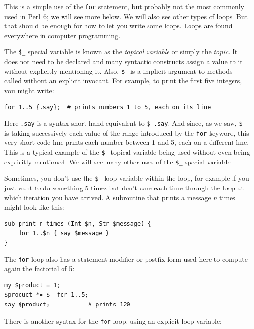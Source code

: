 This is a simple use of the {\tt for} statement, 
but probably not the most commonly used in Perl~6; 
we will see more below. We will also see other types of loops. 
But that should be enough for now to let you write some loops. Loops 
are found everywhere in computer programming.

The \verb"$_" special variable is known as the \emph{topical 
variable} or simply the \emph{topic}. It does not need to be declared 
and many syntactic constructs assign a value to it without 
explicitly mentioning it. Also, \verb"$_" is a implicit argument 
to methods called without an explicit invocant. For example, 
to print the first five integers, you might write:

\begin{verbatim}
for 1..5 {.say};  # prints numbers 1 to 5, each on its line
\end{verbatim} 

Here {\tt .say} is a syntax short hand equivalent to \verb"$_.say". And 
since, as we saw, \verb"$_" is taking successively each value of 
the range introduced by the {\tt for} keyword, this very short code 
line prints each number between 1 and 5, each on a different line. 
This is a typical example of the \verb"$_" topical variable being used 
without even being explicitly mentioned. We will see many other 
uses of the \verb"$_" special variable. 

Sometimes, you don't use the \verb"$_" loop variable within the 
loop, for example if you just want to do something 5 times but don't 
care each time through the loop at which iteration you 
have arrived. A subroutine that prints a message \emph{n} times 
might look like this:

\begin{verbatim}
sub print-n-times (Int $n, Str $message) {
    for 1..$n { say $message }
} 
\end{verbatim} 


The {\tt for} loop also has a statement modifier or postfix form 
used here to compute again the factorial of 5:

\begin{verbatim}
my $product = 1;
$product *= $_ for 1..5;
say $product;           # prints 120
\end{verbatim} 

There is another syntax for the {\tt for} loop, using an explicit loop variable:

